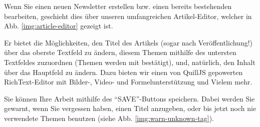Wenn Sie einen neuen Newsletter erstellen bzw.
einen bereits bestehenden bearbeiten,
geschieht dies über unseren umfangreichen Artikel-Editor,
welcher in Abb. \ref{img:article-editor} gezeigt ist.


Er bietet die Möglichkeiten,
den Titel des Artikels (sogar nach Veröffentlichung!)
über das oberste Textfeld zu ändern,
diesem Themen mithilfe des untersten Textfeldes zuzuordnen
(Themen werden mit  bestätigt),
und, natürlich,
den Inhalt über das Hauptfeld zu ändern.
Dazu bieten wir einen von QuillJS gepowerten RichText-Editor
mit Bilder-, Video- und Formelunterstützung und Vielem mehr.

Sie können Ihre Arbeit mithilfe des ``SAVE''-Buttons speichern.
Dabei werden Sie gewarnt,
wenn Sie vergessen haben,
einen Titel anzugeben,
oder bis jetzt noch nie verwendete Themen benutzen
(siehe Abb. \ref{img:warn-unknown-tag}).

